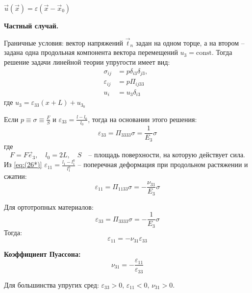 $\vec{u}(\vec{x}) = \varepsilon (\vec{x} - \vec{x}_0) \quad \label{eq:(269)}$


\textbf{Частный случай.}

Граничные условия: вектор напряжений \( \vec{t}_n \) задан на одном торце, а на втором – задана одна продольная компонента вектора перемещений \( u_3 = \text{const} \). Тогда решение задачи линейной теории упругости имеет вид:
\begin{align}
\sigma_{ij} &= p \delta_{i3} \delta_{j3}, \\
\varepsilon_{ij} &= p \Pi_{i j 33} \quad \label{eq:(26*)}\\
u_i &= u_3 \delta_{i3}
\end{align}
где $u_3 = \varepsilon_{33}(x + L) + u_{3_0}$
\par
Если \( p \equiv\sigma \equiv \frac{F}{S} \) и \( \varepsilon_{33} = \frac{l - l_0}{l_0} \), тогда на основании этого решения:
\begin{equation}
\varepsilon_{33} = \Pi_{3333} \sigma = \frac{1}{E_3} \sigma
\end{equation}
где
\[
F = F \vec{e}_3, \quad l_0 = 2L, \quad S \quad \text{– площадь поверхности, на которую действует сила.}
\]
Из \ref{eq:(26*)} \( \varepsilon_{11} = \frac{l_1 - l_1^0}{l_1^0} \) – поперечная деформация при продольном растяжении и сжатии:
\begin{equation}
\varepsilon_{11} = \Pi_{1133} \sigma = - \frac{\nu_{31}}{E_3} \sigma
\end{equation}

Для ортотропных материалов:
\begin{equation}
\varepsilon_{33} = \Pi_{3333} \sigma = - \frac{1}{E_3} \sigma
\end{equation}
Тогда:
\begin{equation}
\varepsilon_{11} = - \nu_{31} \varepsilon_{33}
\end{equation}

\textbf{Коэффициент Пуассона:}
\begin{equation}
\nu_{31} = - \frac{\varepsilon_{11}}{\varepsilon_{33}}
\end{equation}

Для большинства упругих сред: \( \varepsilon_{33} > 0, \, \varepsilon_{11} < 0, \, \nu_{31} > 0 \).
